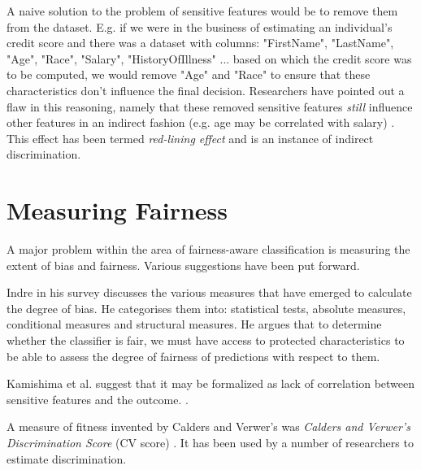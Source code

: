\documentclass[a4paper, 12pt, notitlepage]{article}
\begin{document}
A naive solution to the problem of sensitive features would be to remove them from the dataset. E.g. if we were in the business of estimating an individual's credit score and there was a dataset with columns: "FirstName", "LastName", "Age", "Race", "Salary", "HistoryOfIllness" ... based on which the credit score was to be computed, we would remove "Age" and "Race" to ensure that these characteristics don't influence the final decision.
Researchers have pointed out a flaw in this reasoning, namely that these removed sensitive features \emph{still} influence other features in an indirect fashion (e.g. age may be correlated with salary) . This effect has been termed \emph{red-lining effect} and is an instance of indirect discrimination.
 \cite[p.~36]{kamishima2012b} \cite[p.~378]{kamishima2012a} \cite[p.~380]{kamishima2012a} \cite[p.~381]{kamishima2012a} 

\section*{Measuring Fairness}

A major problem within the area of fairness-aware classification is measuring the extent of bias and fairness. \cite[p.281]{calders2010} Various suggestions have been put forward.

\vspace{0.25cm}

Indre in his survey discusses the various measures that have emerged to calculate the degree of bias. He categorises them into: statistical tests, absolute measures, conditional measures and structural measures. He argues that to determine whether the classifier is fair, we must have access to protected characteristics to be able to assess the degree of fairness of predictions with respect to them. \cite[p.~8]{indre2015}

\vspace{0.25cm}

Kamishima et al. suggest that it may be formalized as lack of correlation between sensitive features and the outcome. \cite[p.~259]{kamishima2018}.

\vspace{0.25cm}

A measure of fitness invented by Calders and Verwer's was \emph{Calders and Verwer's Discrimination Score} (CV score) \cite[p.~281]{calders2010}. It has been used by a number of researchers to estimate discrimination.  \cite[p.~44]{kamishima2012b} \cite[p.~381]{kamishima2012a}
\end{document}
